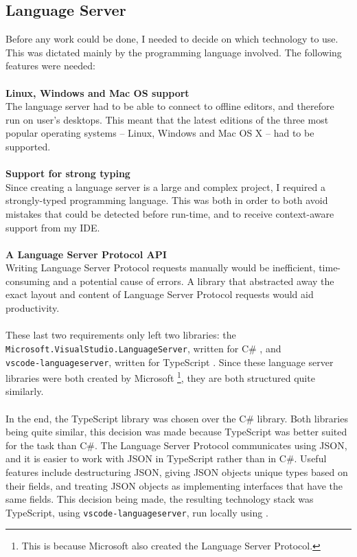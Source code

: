\documentclass[../main.tex]{subfiles}
\begin{document}
\subsection{Language Server}
Before any work could be done, I needed to decide on which technology to use. This was dictated mainly by the programming language involved. The following features were needed:
\\
\\
\textbf{Linux, Windows and Mac OS support} \\
The language server had to be able to connect to offline editors, and therefore run on user's desktops. This meant that the latest editions of the three most popular operating systems -- Linux, Windows and Mac OS X -- had to be supported.
\\
\\
\textbf{Support for strong typing} \\
Since creating a language server is a large and complex project, I required a strongly-typed programming language. This was both in order to both avoid mistakes that could be detected before run-time, and to receive context-aware support from my IDE.
\\
\\
\textbf{A Language Server Protocol API} \\
Writing Language Server Protocol requests manually would be inefficient, time-consuming and a potential cause of errors. A library that abstracted away the exact layout and content of Language Server Protocol requests would aid productivity.
\\ 
\\
These last two requirements only left two libraries: the \\ 
\texttt{Microsoft.VisualStudio.LanguageServer}, written for C\# \cite{visual_studio_language_server}, and \\ 
\texttt{vscode-languageserver}, written for TypeScript \cite{vsc_langserver_docs}. Since these language server libraries were both created by Microsoft \footnote{This is because Microsoft also created the Language Server Protocol.}, they are both structured quite similarly. 
\\
\\
In the end, the TypeScript library was chosen over the C\# library. Both libraries being quite similar, this decision was made because TypeScript was better suited for the task than C\#. The Language Server Protocol communicates using JSON, and it is easier to work with JSON in TypeScript rather than in C\#. Useful features include destructuring JSON, giving JSON objects unique types based on their fields, and treating JSON objects as implementing interfaces that have the same fields. This decision being made, the resulting technology stack was TypeScript, using \texttt{vscode-languageserver}, run locally using . 
\end{document}
